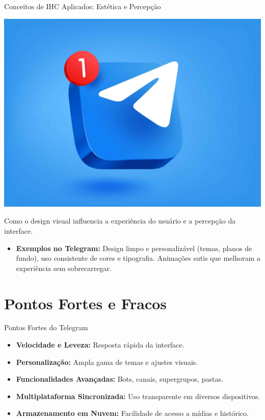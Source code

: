 \documentclass[aspectratio=169,xcolor=table]{beamer}
\begin{document}
\begin{frame}{Conceitos de IHC Aplicados: Estética e Percepção}
    \begin{center}
        \includegraphics[height=0.4\textheight]{telegram-temas.jpg}
    \end{center}
    
    Como o design visual influencia a experiência do usuário e a percepção da interface.
    
    \begin{itemize}
        \item \textbf{Exemplos no Telegram:} Design limpo e personalizável (temas, planos de fundo), uso consistente de cores e tipografia. Animações sutis que melhoram a experiência sem sobrecarregar.
    \end{itemize}
\end{frame}

\section{Pontos Fortes e Fracos}
\begin{frame}{Pontos Fortes do Telegram}
    \begin{itemize}
        \item \textbf{Velocidade e Leveza:} Resposta rápida da interface.
        \item \textbf{Personalização:} Ampla gama de temas e ajustes visuais.
        \item \textbf{Funcionalidades Avançadas:} Bots, canais, supergrupos, pastas.
        \item \textbf{Multiplataforma Sincronizada:} Uso transparente em diversos dispositivos.
        \item \textbf{Armazenamento em Nuvem:} Facilidade de acesso a mídias e histórico.
    \end{itemize}
\end{frame}
\end{document}
